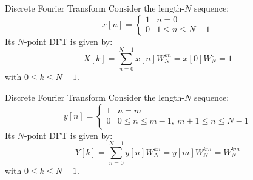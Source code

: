 \documentclass[../../main/main.tex]{subfiles}
\begin{document}
\begin{example}{Discrete Fourier Transform}{}
    Consider the length-\( N \) sequence:
    \begin{equation}
        x[n]
        =
        \begin{cases}
            1   &   n=0 \\
            0   &   1 \le n \le N-1
        \end{cases}
        \label{eq:L12_S11_1}
    \end{equation}
    Its \( N \)-point DFT is given by:
    \begin{equation}
        X[k]
        =
        \sum_{n=0}^{N-1} x[n] W_{N}^{kn}
        =
        x[0] W_{N}^{0}
        =
        1
        \label{eq:L12_S11_2}
    \end{equation}
    with \( 0 \le k \le N-1 \).
\end{example}

\begin{example}{Discrete Fourier Transform}{}
    Consider the length-\( N \) sequence:
    \begin{equation}
        y[n]
        =
        \begin{cases}
            1   &   n=m \\
            0   &   0 \le n \le m-1, \ m+1 \le n \le N-1
        \end{cases}
        \label{eq:L12_S12_1}
    \end{equation}
    Its \( N \)-point DFT is given by:
    \begin{equation}
        Y[k]
        =
        \sum_{n=0}^{N-1} y[n] W_{N}^{kn}
        =
        y[m] W_{N}^{km}
        =
        W_{N}^{km}
        \label{eq:L12_S12_2}
    \end{equation}
    with \( 0 \le k \le N-1 \).
\end{example}
\end{document}
